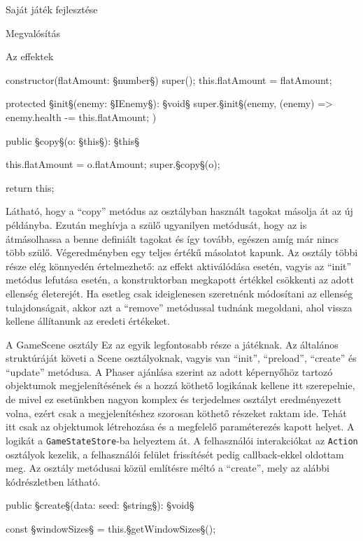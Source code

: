 \begin{MyChapter}{Saját játék fejlesztése}
\begin{MySection}{Megvalósítás}
\begin{MySubSection}{Az effektek}
\begin{javascript}
{	constructor(flatAmount: §\color{jsType}number§) {
		super();
		this.flatAmount = flatAmount;
	}
	
	protected §\color{jsMethod}init§(enemy: §\color{jsType}IEnemy§): §\color{jsType}void§ {
		super.§\color{jsMethod}init§(enemy, (enemy) => {
			enemy.health -= this.flatAmount;
		})
	}
	
	public §\color{jsMethod}copy§(o: §\color{jsType}this§): §\color{jsType}this§ {
		this.flatAmount = o.flatAmount;
		super.§\color{jsMethod}copy§(o);
		
		return this;
	}
}
			\end{javascript}
			Látható, hogy a ``copy'' metódus az osztályban használt tagokat másolja át az új példányba. Ezután meghívja a szülő ugyanilyen metódusát, hogy az is átmásolhassa a benne definiált tagokat és így tovább, egészen amíg már nincs több szülő. Végeredményben egy teljes értékű másolatot kapunk.
			Az osztály többi része elég könnyedén értelmezhető: az effekt aktiválódása esetén, vagyis az ``init'' metódus lefutása esetén, a konstruktorban megkapott értékkel csökkenti az adott ellenség életerejét. Ha esetleg csak ideiglenesen szeretnénk módosítani az ellenség tulajdonságait, akkor azt a ``remove'' metódussal tudnánk megoldani, ahol vissza kellene állítanunk az eredeti értékeket.

		\end{MySubSection}
		
		\begin{MySubSection}{A GameScene osztály}
			Ez az egyik legfontosabb része a játéknak. Az általános struktúráját követi a Scene osztályoknak, vagyis van ``init'', ``preload'', ``create'' és ``update'' metódusa.
			A Phaser ajánlása szerint az adott képernyőhöz tartozó objektumok megjelenítésének és a hozzá köthető logikának kellene itt szerepelnie, de mivel ez esetünkben nagyon komplex és terjedelmes osztályt eredményezett volna, ezért csak a megjelenítéshez szorosan köthető részeket raktam ide. Tehát itt csak az objektumok létrehozása és a megfelelő paraméterezés kapott helyet. A logikát a \texttt{GameStateStore}-ba helyeztem át. A felhasználói interakciókat az \texttt{Action} osztályok kezelik, a felhasználói felület frissítését pedig callback-ekkel oldottam meg. Az osztály metódusai közül említésre méltó a ``create'', mely az alábbi kódrészletben látható.	
			\begin{javascript}
public §\color{jsMethod}create§(data: {seed: §\color{jsType}string§}): §\color{jsType}void§ {
	const §\color{jsConst}windowSizes§ = this.§\color{jsMethod}getWindowSizes§();
	
}
\end{javascript}
\end{MySubSection}
\end{MySection}
\end{MyChapter}
